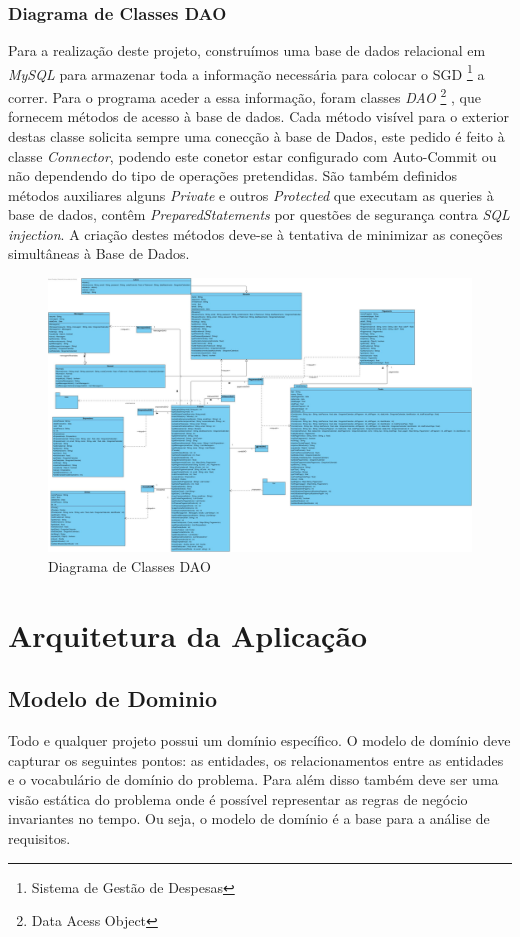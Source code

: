 \newpage
\subsection{Diagrama de Classes DAO}

Para a realização deste projeto, construímos uma base de dados relacional em \textit{MySQL} para armazenar toda a informação necessária para colocar o SGD \footnote{Sistema de Gestão de Despesas} a correr. Para o programa aceder a essa informação, foram classes \textit{DAO} \footnote{Data Acess Object} , que fornecem métodos de acesso à base de dados. Cada método visível para o exterior
destas classe solicita sempre uma conecção à base de Dados, este pedido é feito à classe \textit{Connector}, podendo este conetor estar configurado com Auto-Commit ou não dependendo do tipo de operações pretendidas.
São também definidos métodos auxiliares alguns \textit{Private} e outros \textit{Protected} que executam as queries à base de dados, contêm \textit{PreparedStatements} por questões de segurança contra \textit{SQL injection}. A criação destes métodos deve-se à tentativa de minimizar as coneções simultâneas à Base de Dados.  


\begin{figure}[htb!]
	\centering
	\includegraphics[scale=0.2]{imagens/diagramaClasses/DiagramaClasseDAO}  
	\caption{Diagrama de Classes DAO  }  
\end{figure}


\chapter{Arquitetura da Aplicação}

\section{Modelo de Dominio }
Todo e qualquer projeto possui um domínio específico. O modelo de domínio deve capturar os seguintes pontos: as entidades, os relacionamentos entre as entidades e o vocabulário de domínio do problema. Para além disso também deve ser uma visão estática do problema onde é possível representar as regras de negócio invariantes no tempo. Ou seja, o modelo de domínio é a base para a análise de requisitos.

